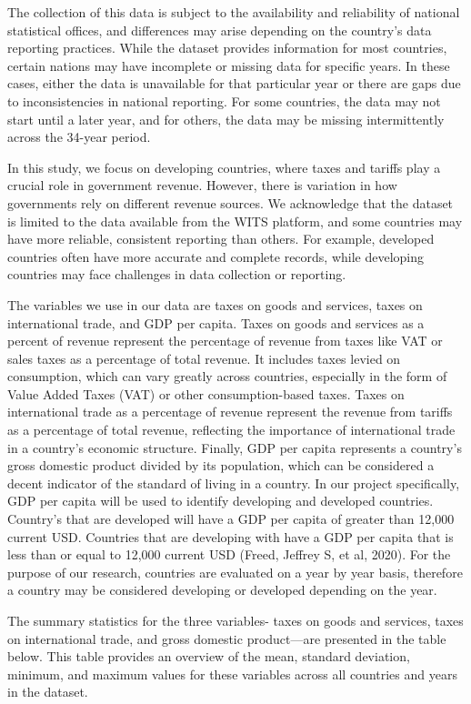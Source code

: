 \documentclass[12pt]{article}
\begin{document}
The collection of this data is subject to the availability and reliability of national statistical offices, and differences may arise depending on the country’s data reporting practices. While the dataset provides information for most countries, certain nations may have incomplete or missing data for specific years. In these cases, either the data is unavailable for that particular year or there are gaps due to inconsistencies in national reporting. For some countries, the data may not start until a later year, and for others, the data may be missing intermittently across the 34-year period.

In this study, we focus on developing countries, where taxes and tariffs play a crucial role in government revenue. However, there is variation in how governments rely on different revenue sources. We acknowledge that the dataset is limited to the data available from the WITS platform, and some countries may have more reliable, consistent reporting than others. For example, developed countries often have more accurate and complete records, while developing countries may face challenges in data collection or reporting.

The variables we use in our data are taxes on goods and services, taxes on international trade, and GDP per capita. Taxes on goods and services as a percent of revenue represent the percentage of revenue from taxes like VAT or sales taxes as a percentage of total revenue. It includes taxes levied on consumption, which can vary greatly across countries, especially in the form of Value Added Taxes (VAT) or other consumption-based taxes. Taxes on international trade as a percentage of revenue represent the revenue from tariffs as a percentage of total revenue, reflecting the importance of international trade in a country's economic structure. Finally, GDP per capita represents a country's gross domestic product divided by its population, which can be considered a decent indicator of the standard of living in a country. In our project specifically, GDP per capita will be used to identify developing and developed countries. Country's that are developed will have a GDP per capita of greater than 12,000 current USD. Countries that are developing with have a GDP per capita that is less than or equal to 12,000 current USD (Freed, Jeffrey S, et al, 2020). For the purpose of our research, countries are evaluated on a year by year basis, therefore a country may be considered developing or developed depending on the year. 

The summary statistics for the three variables- taxes on goods and services, taxes on international trade, and gross domestic product—are presented in the table below. This table provides an overview of the mean, standard deviation, minimum, and maximum values for these variables across all countries and years in the dataset.
\end{document}
